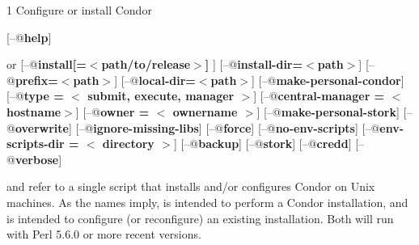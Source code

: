 \begin{ManPage}{\label{man-condor-configure}}{1}
{Configure or install Condor}


\Synopsis {}
[\verb@--@\textbf{help}]

 or 
[\verb@--@\textbf{install[=$<$path/to/release$>$] }]
[\verb@--@\textbf{install-dir=$<$path$>$}]
[\verb@--@\textbf{prefix=$<$path$>$}]
[\verb@--@\textbf{local-dir=$<$path$>$}]
[\verb@--@\textbf{make-personal-condor}]
[\verb@--@\textbf{type = $<$ submit, execute, manager $>$}]
[\verb@--@\textbf{central-manager = $<$ hostname$>$}]
[\verb@--@\textbf{owner = $<$ ownername $>$}]
[\verb@--@\textbf{make-personal-stork}]
[\verb@--@\textbf{overwrite}]
[\verb@--@\textbf{ignore-missing-libs}]
[\verb@--@\textbf{force}]
[\verb@--@\textbf{no-env-scripts}]
[\verb@--@\textbf{env-scripts-dir = $<$ directory $>$}]
[\verb@--@\textbf{backup}]
[\verb@--@\textbf{stork}]
[\verb@--@\textbf{credd}]
[\verb@--@\textbf{verbose}]





\Description 

 and  refer to a single script that installs
and/or configures Condor on Unix machines.  As the names imply,
 is intended to perform a Condor installation, and
 is intended to configure (or reconfigure) an
existing installation.
Both will run with Perl 5.6.0 or more recent versions.


\end{ManPage}
